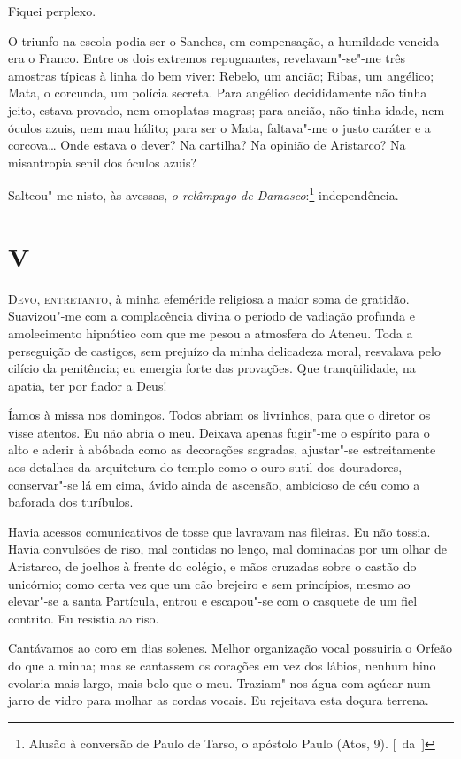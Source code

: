 Fiquei perplexo. 

O triunfo na escola podia ser o Sanches, em
compensação, a humildade vencida era o Franco. Entre os dois extremos
repugnantes, revelavam"-se"-me três amostras típicas à linha do bem
viver: Rebelo, um ancião; Ribas, um angélico; Mata, o corcunda, um
polícia secreta. Para angélico decididamente não tinha jeito, estava
provado, nem omoplatas magras; para ancião, não tinha idade, nem óculos
azuis, nem mau hálito; para ser o Mata, faltava"-me o justo caráter e
a corcova\ldots{} Onde estava o dever? Na cartilha? Na opinião de Aristarco?
Na misantropia senil dos óculos azuis? 

Salteou"-me nisto, às avessas,
\textit{o relâmpago de Damasco}:\footnote{ Alusão à conversão de Paulo de Tarso, 
o apóstolo Paulo (Atos, 9). \mbox{[~da ]}} independência. 

\section{V}

\noindent\textsc{Devo, entretanto}, à minha efeméride religiosa a maior soma de gratidão.
Suavizou"-me com a complacência divina o período de vadiação profunda
e amolecimento hipnótico com que me pesou a atmosfera do Ateneu. Toda a
perseguição de castigos, sem prejuízo da minha delicadeza
moral, resvalava pelo cilício da penitência; eu emergia forte das provações.
Que tranqüilidade, na apatia, ter por fiador a Deus! 

Íamos à missa nos domingos. Todos abriam os livrinhos, para que o diretor os visse
atentos. Eu não abria o meu. Deixava apenas fugir"-me o espírito para
o alto e aderir à abóbada como as decorações sagradas, ajustar"-se
estreitamente aos detalhes da arquitetura do templo como o ouro sutil
dos douradores, conservar"-se lá em cima, ávido ainda de ascensão,
ambicioso de céu como a baforada dos turíbulos. 

Havia acessos comunicativos de tosse que lavravam nas fileiras. Eu não tossia. 
Havia convulsões de riso, mal contidas no lenço, mal dominadas por um olhar
de Aristarco, de joelhos à frente do colégio, e mãos cruzadas sobre o
castão do unicórnio; como certa vez que um cão brejeiro e sem
princípios, mesmo ao elevar"-se a santa Partícula, entrou e
escapou"-se com o casquete de um fiel contrito. Eu resistia ao riso.

Cantávamos ao coro em dias solenes. Melhor organização vocal possuiria
o Orfeão do que a minha; mas se cantassem os corações em vez dos
lábios, nenhum hino evolaria mais largo, mais belo que o meu.
Traziam"-nos água com açúcar num jarro de vidro para molhar as cordas
vocais. Eu rejeitava esta doçura terrena. 

